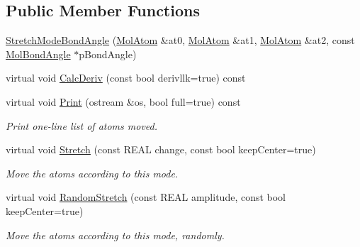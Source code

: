 \subsection*{Public Member Functions}
\begin{DoxyCompactItemize}
\item 
\mbox{\hyperlink{struct_obj_cryst_1_1_stretch_mode_bond_angle_aa1fbf3238722b663b083c999cf1b5c57}{Stretch\+Mode\+Bond\+Angle}} (\mbox{\hyperlink{class_obj_cryst_1_1_mol_atom}{Mol\+Atom}} \&at0, \mbox{\hyperlink{class_obj_cryst_1_1_mol_atom}{Mol\+Atom}} \&at1, \mbox{\hyperlink{class_obj_cryst_1_1_mol_atom}{Mol\+Atom}} \&at2, const \mbox{\hyperlink{class_obj_cryst_1_1_mol_bond_angle}{Mol\+Bond\+Angle}} $\ast$p\+Bond\+Angle)
\item 
virtual void \mbox{\hyperlink{struct_obj_cryst_1_1_stretch_mode_bond_angle_a72c7ded6a3919b589dabbbd46c43671b}{Calc\+Deriv}} (const bool derivllk=true) const
\item 
\mbox{\label{struct_obj_cryst_1_1_stretch_mode_bond_angle_a21640e9364fa2f8b7683e66cc99ac6ce}} 
virtual void \mbox{\hyperlink{struct_obj_cryst_1_1_stretch_mode_bond_angle_a21640e9364fa2f8b7683e66cc99ac6ce}{Print}} (ostream \&os, bool full=true) const
\begin{DoxyCompactList}\small\item\em Print one-\/line list of atoms moved. \end{DoxyCompactList}\item 
\mbox{\label{struct_obj_cryst_1_1_stretch_mode_bond_angle_a961e6383b3da785530cba665561ec4ac}} 
virtual void \mbox{\hyperlink{struct_obj_cryst_1_1_stretch_mode_bond_angle_a961e6383b3da785530cba665561ec4ac}{Stretch}} (const R\+E\+AL change, const bool keep\+Center=true)
\begin{DoxyCompactList}\small\item\em Move the atoms according to this mode. \end{DoxyCompactList}\item 
\mbox{\label{struct_obj_cryst_1_1_stretch_mode_bond_angle_a367e3643da36e94c1581a5a00065017d}} 
virtual void \mbox{\hyperlink{struct_obj_cryst_1_1_stretch_mode_bond_angle_a367e3643da36e94c1581a5a00065017d}{Random\+Stretch}} (const R\+E\+AL amplitude, const bool keep\+Center=true)
\begin{DoxyCompactList}\small\item\em Move the atoms according to this mode, randomly. \end{DoxyCompactList}\end{DoxyCompactItemize}
